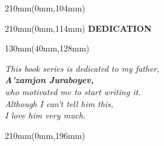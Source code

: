 \documentclass[a4paper]{article}
\begin{document}
\mbox{}
\begin{textblock*}{210mm}(0mm,104mm)
\centering
{}
\end{textblock*}

\begin{textblock*}{210mm}(0mm,114mm)
\centering
{\sffamily\bfseries\color{accent}\fontsize{12}{14}\selectfont\MakeUppercase{Dedication}}
\end{textblock*}

\begin{textblock*}{130mm}(40mm,128mm)
\centering
{\color{ink}\fontsize{15}{25}\selectfont\itshape
This book series is dedicated to my father,\\[2mm]
{\upshape\bfseries\color{accent}A’zamjon Juraboyev,}\\[2mm]
who motivated me to start writing it.\\[8mm]
Although I can’t tell him this,\\
I love him very much.\par}
\end{textblock*}

\begin{textblock*}{210mm}(0mm,196mm)
\centering
{}
\end{textblock*}
\end{document}
